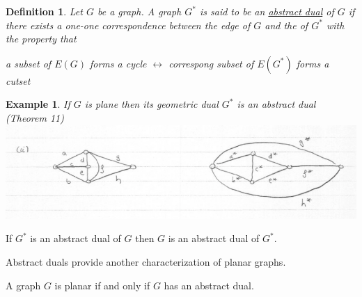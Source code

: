 \documentclass[12pt]{article}
\newenvironment{theorem}[1]{%
  \renewcommand\themanualtheoreminner{#1}%
  \manualtheoreminner
}{\endmanualtheoreminner}
\newtheorem{example}{Example}
\newtheorem{definition}{Definition}
\begin{document}
\begin{definition}
	Let $G$ be a graph. A graph $G^{*}$ is said to be an \underline{abstract dual} of $G$ if there exists a one-one correspondence between the edge of $G$ and the of $G^{*}$ with the property that

	a subset of $E(G)$ forms a cycle $\leftrightarrow$ correspong subset of $E(G^{*})$ forms a cutset
\end{definition}

\begin{example}
	If $G$ is plane then its geometric dual $G^{*}$ is an abstract dual (Theorem 11)
	\includegraphics[scale=0.5]{dual2}
\end{example}


\begin{theorem}{14}
	If $G^{*}$ is an abstract dual of $G$ then $G$ is an abstract dual of $G^{*}$.

	Abstract duals provide another characterization of planar graphs.
\end{theorem}

\begin{theorem}{15}
	A graph $G$ is planar if and only if $G$ has an abstract dual.
\end{theorem}
\end{document}
